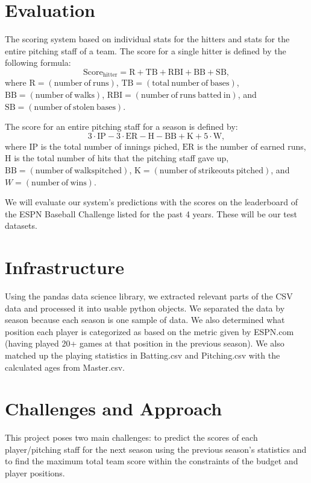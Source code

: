 \documentclass[11pt]{amsart}
\begin{document}
\section{Evaluation}
\label{eval}
The scoring system based on individual stats for the hitters and stats for the entire pitching staff of a team. The score for a single hitter is defined by the following formula:
\begin{equation}
\mathrm{Score_{hitter}} = \mathrm{R} + \mathrm{TB} + \mathrm{RBI} + \mathrm{BB} + \mathrm{SB},
\end{equation}
where 
$\mathrm{R}= (\mathrm{number\ of\ runs})$, $\mathrm{TB} = (\mathrm{total\ number\ of\ bases})$, $\mathrm{BB} = (\mathrm{number\ of\ walks})$, $\mathrm{RBI} = (\mathrm{number\ of\ runs\ batted\ in})$, and $\mathrm{SB} = (\mathrm{number\ of\ stolen\ bases})$. 

The score for an entire pitching staff for a season is defined by:
\begin{equation}
3\cdot \mathrm{IP} - 3\cdot \mathrm{ER} - \mathrm{H} - \mathrm{BB} + \mathrm{K} + 5 \cdot \mathrm{W},
\end{equation}
where $\mathrm{IP}$ is the total number of innings piched, $\mathrm{ER}$ is the number of earned runs, $\mathrm{H}$ is the total number of hits that the pitching staff gave up, $\mathrm{BB} = (\mathrm{number\ of\ walks pitched})$, $\mathrm{K} = (\mathrm{number\ of\ strikeouts\ pitched})$, and $W = (\mathrm{number\ of\ wins})$.

We will evaluate our system's predictions with the scores on the leaderboard of the ESPN Baseball Challenge listed for the past 4 years. These will be our test datasets.

\section{Infrastructure}
Using the pandas data science library, we extracted relevant parts of the CSV data and processed it into usable python objects. We separated the data by season because each season is one sample of data. We also determined what position each player is categorized as based on the metric given by ESPN.com (having played 20+ games at that position in the previous season). We also matched up the playing statistics in Batting.csv and Pitching.csv with the calculated ages from Master.csv.

\section{Challenges and Approach}
This project poses two main challenges: to predict the scores of each player/pitching staff for the next season using the previous season's statistics and to find the maximum total team score within the constraints of the budget and player positions.
\end{document}

